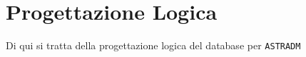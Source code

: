 \chapter{Progettazione Logica}
Di qui si tratta della progettazione logica del database per
\texttt{ASTRADM}




